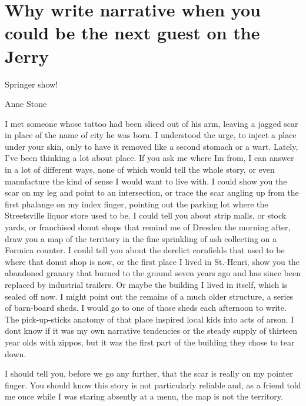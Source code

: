 \hypertarget{why-write-narrative-when-you-could-be-the-next-guest-on-the-jerry}{%
\section{Why write narrative when you could be the next guest on the
Jerry}\label{why-write-narrative-when-you-could-be-the-next-guest-on-the-jerry}}

Springer show!

Anne Stone

I met someone whose tattoo had been sliced out of his arm, leaving a
jagged scar in place of the name of city he was born. I understood the
urge, to inject a place under your skin, only to have it removed like a
second stomach or a wart. Lately, I've been thinking a lot about place.
If you ask me where Im from, I can answer in a lot of different ways,
none of which would tell the whole story, or even manufacture the kind
of sense I would want to live with. I could show you the scar on my leg
and point to an intersection, or trace the scar angling up from the
first phalange on my index finger, pointing out the parking lot where
the Streetsville liquor store used to be. I could tell you about strip
malls, or stock yards, or franchised donut shops that remind me of
Dresden the morning after, draw you a map of the territory in the fine
sprinkling of ash collecting on a Formica counter. I could tell you
about the derelict cornfields that used to be where that donut shop is
now, or the first place I lived in St.-Henri, show you the abandoned
granary that burned to the ground seven years ago and has since been
replaced by industrial trailers. Or maybe the building I lived in
itself, which is sealed off now. I might point out the remains of a much
older structure, a series of barn-board sheds. I would go to one of
those sheds each afternoon to write. The pick-up-sticks anatomy of that
place inspired local kids into acts of arson. I dont know if it was my
own narrative tendencies or the steady supply of thirteen year olds with
zippos, but it was the first part of the building they chose to tear
down.

I should tell you, before we go any further, that the scar is really on
my pointer finger. You should know this story is not particularly
reliable and, as a friend told me once while I was staring absently at a
menu, the map is not the territory.

